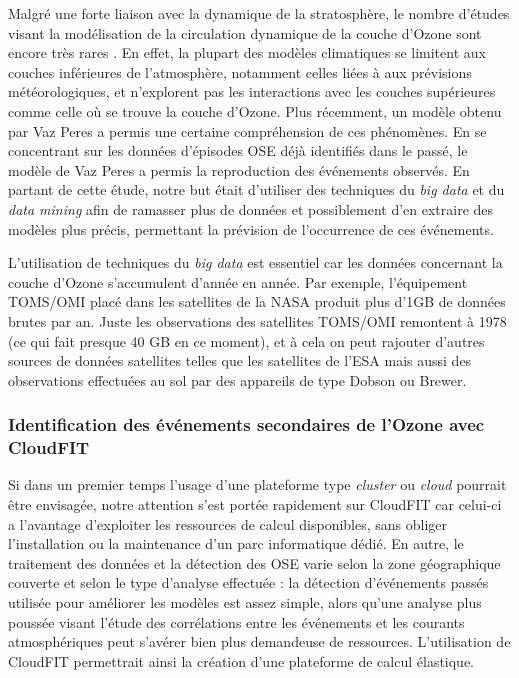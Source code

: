 Malgré une forte liaison avec la dynamique de la stratosphère, le nombre d'études visant la modélisation de la circulation dynamique de la couche d'Ozone sont encore très rares \cite{Marchand2005}. En effet, la plupart des modèles climatiques se limitent aux couches inférieures de l'atmosphère, notamment celles liées à aux prévisions météorologiques, et n'explorent pas les interactions avec les couches supérieures comme celle où se trouve la couche d'Ozone. Plus récemment, un modèle obtenu par Vaz Peres \cite{Peres2013} a permis une certaine compréhension de ces phénomènes. En se concentrant sur les données d'épisodes OSE déjà identifiés dans le passé, le modèle de Vaz Peres a permis la reproduction des événements observés. En partant de cette étude, notre but était d'utiliser des techniques du \textit{big data} et du \textit{data mining} afin de ramasser plus de données et possiblement d'en extraire des modèles plus précis, permettant la prévision de l'occurrence de ces événements.

L'utilisation de techniques du \textit{big data} est essentiel car les données concernant la couche d'Ozone s'accumulent d'année en année. Par exemple, l'équipement TOMS/OMI placé dans les satellites de la NASA produit plus d'1GB de données brutes par an. Juste les observations des satellites TOMS/OMI remontent à 1978 (ce qui fait presque 40 GB en ce moment), et à cela on peut rajouter d'autres sources de données satellites telles que les satellites de l'ESA mais aussi des observations effectuées au sol par des appareils de type Dobson ou Brewer. 

\subsubsection*{Identification des événements secondaires de l'Ozone avec CloudFIT\label{sec:development}}

Si dans un premier temps l'usage d'une plateforme type \textit{cluster} ou \textit{cloud} pourrait être envisagée, notre attention s'est portée rapidement sur CloudFIT car celui-ci a l'avantage d'exploiter les ressources de calcul disponibles, sans obliger l'installation ou la maintenance d'un parc informatique dédié. En autre, le traitement des données et la détection des OSE varie selon la zone géographique couverte et selon le type d'analyse effectuée : la détection d'événements passés utilisée pour améliorer les modèles est assez simple, alors qu'une analyse plus poussée visant l'étude des corrélations entre les événements et les courants atmosphériques peut s'avérer bien plus demandeuse de ressources. L'utilisation de CloudFIT permettrait ainsi la création d'une plateforme de calcul élastique.

